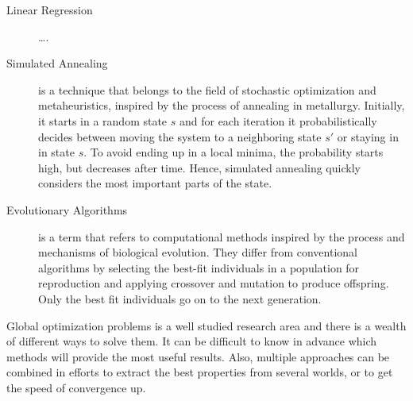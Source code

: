 \begin{description}
    \item[Linear Regression] \dots.
    \item[Simulated Annealing] is a technique that belongs to the field of
        stochastic optimization and metaheuristics, inspired by the process of
        annealing in metallurgy. Initially, it starts in a random state $s$ and
        for each iteration it probabilistically decides between moving the
        system to a neighboring state $s'$ or staying in in state $s$. To avoid
        ending up in a local minima, the probability starts high, but decreases
        after time. Hence, simulated annealing quickly considers the most
        important parts of the state.
    \item[Evolutionary Algorithms] is a term that refers to computational
        methods inspired by the process and mechanisms of biological evolution.
        They differ from conventional algorithms by selecting the best-fit
        individuals in a population for reproduction and applying crossover and
        mutation to produce offspring. Only the best fit individuals go on to
        the next generation.
\end{description}

Global optimization problems is a well studied research area and there is a
wealth of different ways to solve them. It can be difficult to know in advance
which methods will provide the most useful results. Also, multiple approaches
can be combined in efforts to extract the best properties from several worlds,
or to get the speed of convergence up.

